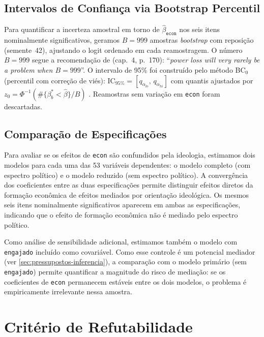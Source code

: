\subsection{Intervalos de Confiança via Bootstrap Percentil}
\label{sec:bootstrap}

Para quantificar a incerteza amostral em torno de $\hat{\beta}_{\texttt{econ}}$ nos seis itens nominalmente significativos, geramos $B = 999$ amostras \textit{bootstrap} com reposição (semente~42), ajustando o logit ordenado em cada reamostragem. O número $B=999$ segue a recomendação de  (cap.~4, p.~170): ``\textit{power loss will very rarely be a problem when $B = 999$}''. O intervalo de 95\% foi construído pelo método BC$_0$ (percentil com correção de viés): $\mathrm{IC}_{95\%} = [q_{\alpha_{lo}},\,q_{\alpha_{hi}}]$ com quantis ajustados por $z_0 = \Phi^{-1}(\#\{\beta^*_b < \hat{\beta}\}/B)$ \cite{davidson2004econometric}. Reamostras sem variação em \texttt{econ} foram descartadas.

\subsection{Comparação de Especificações}
\label{sec:spec_comparison}

Para avaliar se os efeitos de \texttt{econ} são confundidos pela ideologia, estimamos dois modelos para cada uma das 53 variáveis dependentes: o modelo completo (com espectro político) e o modelo reduzido (sem espectro político). A convergência dos coeficientes entre as duas especificações permite distinguir efeitos diretos da formação econômica de efeitos mediados por orientação ideológica. Os mesmos seis itens nominalmente significativos aparecem em ambas as especificações, indicando que o efeito de formação econômica não é mediado pelo espectro político.

Como análise de sensibilidade adicional, estimamos também o modelo com \texttt{engajado} incluído como covariável. Como esse controle é um potencial mediador (ver \autoref{sec:pressupostos-inferencia}), a comparação com o modelo primário (sem \texttt{engajado}) permite quantificar a magnitude do risco de mediação: se os coeficientes de \texttt{econ} permanecem estáveis entre os dois modelos, o problema é empiricamente irrelevante nessa amostra.

\section{Critério de Refutabilidade}

